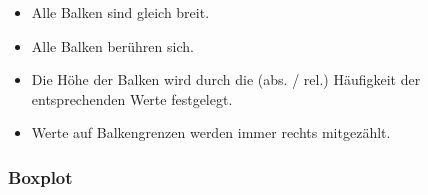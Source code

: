\begin{multicols}{2}
\begin{itemize}
\item Alle Balken sind gleich breit.
\item Alle Balken berühren sich.
\item Die Höhe der Balken wird durch die (abs. / rel.) Häufigkeit der entsprechenden
Werte festgelegt.
\item Werte auf Balkengrenzen werden immer rechts mitgezählt.
\end{itemize}



\end{multicols}

\subsubsection*{Boxplot}


\hrulefill

